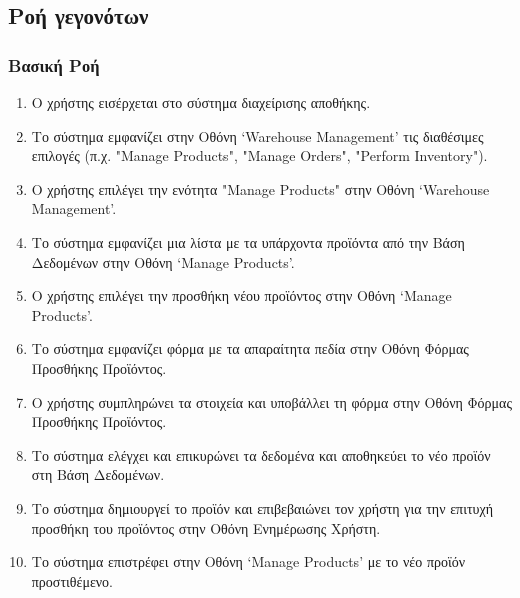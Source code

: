 \documentclass[12pt,a4paper,twoside]{book}
\begin{document}
\subsection{Ροή γεγονότων}

\subsubsection{Βασική Ροή}
\begin{enumerate}
  \item Ο χρήστης εισέρχεται στο σύστημα διαχείρισης αποθήκης. %
  \item Το σύστημα εμφανίζει στην Οθόνη `Warehouse Management' τις διαθέσιμες επιλογές (π.χ. "Manage Products", "Manage Orders", "Perform Inventory"). %
  \item Ο χρήστης επιλέγει την ενότητα "Manage Products" στην Οθόνη `Warehouse Management'. %
  \item Το σύστημα εμφανίζει μια λίστα με τα υπάρχοντα προϊόντα από την Βάση Δεδομένων στην Οθόνη `Manage Products'. %
  \item Ο χρήστης επιλέγει την προσθήκη νέου προϊόντος στην Οθόνη `Manage Products'. %
  \item Το σύστημα εμφανίζει φόρμα με τα απαραίτητα πεδία στην Οθόνη Φόρμας Προσθήκης Προϊόντος. %
  \item Ο χρήστης συμπληρώνει τα στοιχεία και υποβάλλει τη φόρμα στην Οθόνη Φόρμας Προσθήκης Προϊόντος.
  \item Το σύστημα ελέγχει και επικυρώνει τα δεδομένα και αποθηκεύει το νέο προϊόν στη Βάση Δεδομένων. %
  \item Το σύστημα δημιουργεί το προϊόν και επιβεβαιώνει τον χρήστη για την επιτυχή προσθήκη του προϊόντος στην Οθόνη Ενημέρωσης Χρήστη. %
  \item Το σύστημα επιστρέφει στην Οθόνη `Manage Products' με το νέο προϊόν προστιθέμενο.
\end{enumerate}
\end{document}
